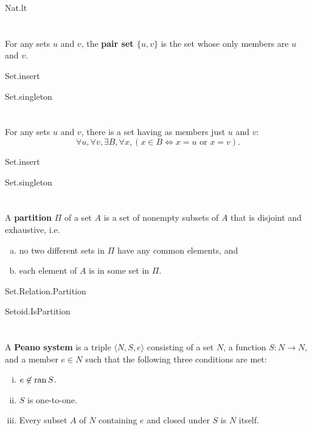 \documentclass{report}
\begin{document}
    {Nat.lt}

\section{}%

  For any sets $u$ and $v$, the \textbf{pair set $\{u, v\}$} is the set whose
    only members are $u$ and $v$.

    {Set.insert}

    {Set.singleton}

\section{}%

  For any sets $u$ and $v$, there is a set having as members just $u$ and $v$:
    $$\forall u, \forall v, \exists B, \forall x,
        (x \in B \iff x = u \text{ or } x = v).$$

    {Set.insert}

    {Set.singleton}

\section{}%

  A \textbf{partition} $\Pi$ of a set $A$ is a set of nonempty subsets of $A$
    that is disjoint and exhaustive, i.e.
    \begin{enumerate}[(a)]
      \item no two different sets in $\Pi$ have any common elements, and
      \item each element of $A$ is in some set in $\Pi$.
    \end{enumerate}

    {Set.Relation.Partition}

    {Setoid.IsPartition}

\section{}%

  A \textbf{Peano system} is a triple $\langle N, S, e \rangle$ consisting of a
    set $N$, a function $S \colon N \rightarrow N$, and a member $e \in N$ such
    that the following three conditions are met:
  \begin{enumerate}[(i)]
    \item $e \not\in \mathop{\text{ran}}{S}$.
    \item $S$ is one-to-one.
    \item Every subset $A$ of $N$ containing $e$ and closed under $S$ is $N$
      itself.
  \end{enumerate}
\end{document}
